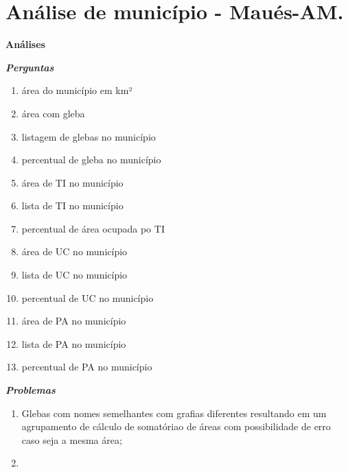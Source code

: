 \documentclass[
  letterpaper,
]{report}
\providecommand{\tightlist}{%
  \setlength{\itemsep}{0pt}\setlength{\parskip}{0pt}}\usepackage{longtable,booktabs,array}
\begin{document}

\hypertarget{anuxe1lise-de-municuxedpio---mauuxe9s-am.}{%
\chapter{Análise de município -
Maués-AM.}\label{anuxe1lise-de-municuxedpio---mauuxe9s-am.}}

\begin{tcolorbox}[enhanced jigsaw, opacityback=0, title=\textcolor{quarto-callout-note-color}{\faInfo}\hspace{0.5em}{Note}, bottomrule=.15mm, bottomtitle=1mm, coltitle=black, leftrule=.75mm, toprule=.15mm, colframe=quarto-callout-note-color-frame, colback=white, toptitle=1mm, left=2mm, titlerule=0mm, arc=.35mm, colbacktitle=quarto-callout-note-color!10!white, rightrule=.15mm, opacitybacktitle=0.6, breakable]

\textbf{Análises}

\textbf{\emph{Perguntas}}

\begin{enumerate}
\def\labelenumi{\arabic{enumi}.}
\tightlist
\item
  área do município em km²
\item
  área com gleba
\item
  listagem de glebas no município
\item
  percentual de gleba no município
\item
  área de TI no município
\item
  lista de TI no município
\item
  percentual de área ocupada po TI
\item
  área de UC no município
\item
  lista de UC no município
\item
  percentual de UC no município
\item
  área de PA no município
\item
  lista de PA no município
\item
  percentual de PA no município
\end{enumerate}

\textbf{\emph{Problemas}}

\begin{enumerate}
\def\labelenumi{\arabic{enumi}.}
\tightlist
\item
  Glebas com nomes semelhantes com grafias diferentes resultando em um
  agrupamento de cálculo de somatóriao de áreas com possibilidade de
  erro caso seja a mesma área;
\item
\end{enumerate}

\end{tcolorbox}
\end{document}

